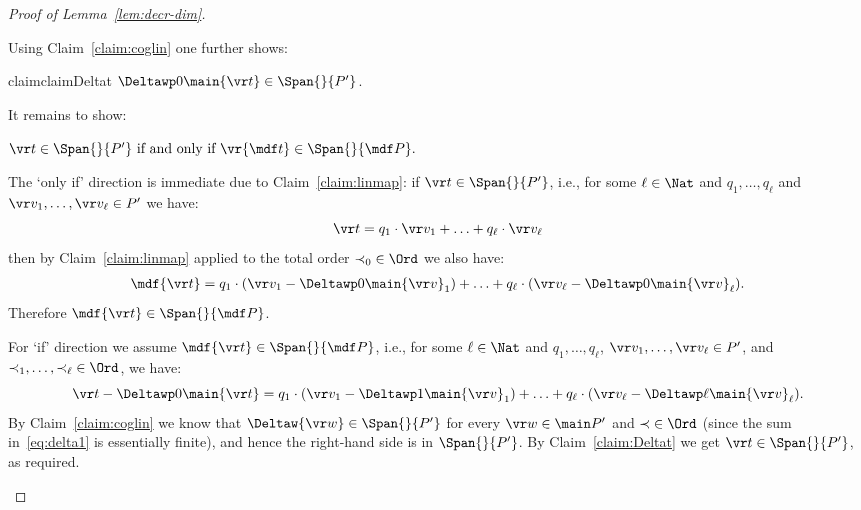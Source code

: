 \begin{proof}[Proof of Lemma~\ref{lem:decr-dim}]
\begin{claimproof}
%
%
\end{claimproof}

Using Claim~\ref{claim:coglin} one further shows:
%
\begin{restatable}{claim}{claimDeltat}
\label{claim:Deltat}
$\Deltawp 0 {\main{\vr t}} \in \Span {} {P'}$.
\end{restatable}
%


It remains to show:
%
\begin{claim} \label{claim:iff}
$\vr t \in \Span {} {P'} \text{ if and only if } \vr {\mdf t} \in \Span {} {\mdf P}.
$
\end{claim}
%
\begin{claimproof}%
The `only if' direction is immediate due to Claim~\ref{claim:linmap}: if $\vr t \in \Span {} {P'}$, i.e., for some
$\ell\in\Nat$ and $q_1, \ldots, q_\ell$ and $\vr v_1, \ldots, \vr v_\ell \in P'$ we have:
\[
\vr t = q_1 \cdot \vr v_1 + \ldots + q_\ell \cdot \vr v_\ell
\]
then by Claim~\ref{claim:linmap} applied to the total order $\prec_0 \; \in \Ord$ we also have:
\begin{align} \label{eq:lincomb}
\mdf{\vr t} = q_1 \cdot (\vr v_1 - \Deltawp 0 {\main{\vr v}}_1) + \ldots + q_\ell \cdot (\vr v_\ell - \Deltawp 0 {\main{\vr v}}_\ell).
\end{align}
Therefore $\mdf{\vr t} \in \Span {}{\mdf P}$.

For `if' direction we assume $\mdf{\vr t} \in \Span {} {\mdf P}$, i.e.,
for some
$\ell\in\Nat$ and $q_1, \ldots, q_\ell$, $\vr v_1, \ldots, \vr v_\ell \in P'$, and $\prec_1, \ldots, \prec_\ell\; \in \Ord$, we have:
\[
\vr t - \Deltawp 0 {\main{\vr t}} = q_1 \cdot (\vr v_1 - \Deltawp 1 {\main{\vr v}}_1) + \ldots + 
q_\ell \cdot (\vr v_\ell - \Deltawp \ell {\main{\vr v}}_\ell).
\]
By Claim~\ref{claim:coglin} we know that $\Deltaw {\vr w} \in \Span{} {P'}$ for every $\vr w \in \main P'$ and $\prec \; \in \Ord$
(since the sum in~\eqref{eq:delta1} is essentially finite), and hence
the right-hand side is in $\Span{} {P'}$.
By Claim~\ref{claim:Deltat} we get $\vr t \in \Span{} {P'}$, as required.
%
\end{claimproof}
%


\end{proof}
